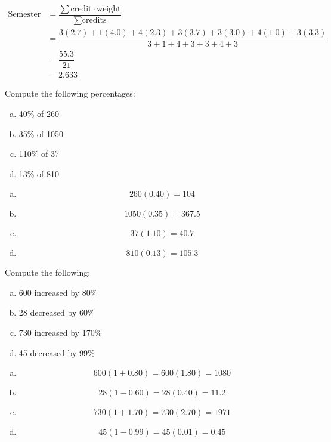 \documentclass[11pt,letterpaper]{article}
\begin{document}
\sol 
	\[
	\begin{aligned}
	\text{Semester GPA}&= \dfrac{\sum \text{credit} \cdot \text{weight}}{\sum \text{credits}} \\[0.3cm]
	&= \dfrac{3(2.7) + 1(4.0) + 4(2.3) + 3(3.7) + 3(3.0) + 4(1.0) + 3(3.3)}{3 + 1 + 4 + 3 + 3 + 4 + 3} \\[0.3cm]
	&= \dfrac{55.3}{21} \\[0.3cm]
	&= 2.633
	\end{aligned}
	\]



\newpage



 Compute the following percentages:
	\begin{enumerate}[(a)]
	\item 40\% of 260
	\item 35\% of 1050
	\item 110\% of 37
	\item 13\% of 810
	\end{enumerate} \pspace

\sol
\begin{enumerate}[(a)]
\item 
	\[
	260(0.40)= 104
	\] \pspace

\item 
	\[
	1050(0.35)= 367.5
	\] \pspace

\item 
	\[
	37(1.10)= 40.7
	\] \pspace

\item 
	\[
	810(0.13)= 105.3
	\]
\end{enumerate}



\newpage



 Compute the following:
	\begin{enumerate}[(a)]
	\item 600 increased by 80\%
	\item 28 decreased by 60\%
	\item 730 increased by 170\%
	\item 45 decreased by 99\%
	\end{enumerate} \pspace

\sol
\begin{enumerate}[(a)]
\item 
	\[
	600(1 + 0.80)= 600(1.80)= 1080
	\] \pspace

\item 
	\[
	28(1 - 0.60)= 28(0.40)= 11.2
	\] \pspace

\item 
	\[
	730(1 + 1.70)= 730(2.70)= 1971
	\] \pspace

\item 
	\[
	45(1 - 0.99)= 45(0.01)= 0.45
	\]
\end{enumerate}
\end{document}
